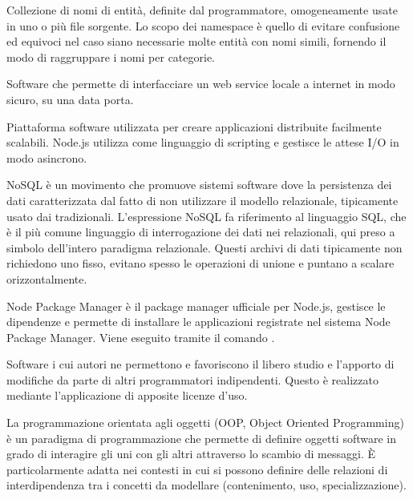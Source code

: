
Collezione di nomi di entità, definite dal programmatore, omogeneamente usate in uno o più file sorgente.  Lo scopo dei namespace è quello di evitare confusione ed equivoci nel caso siano necessarie molte entità con nomi simili, fornendo il modo di raggruppare i nomi per categorie. 

Software che permette di interfacciare un web service locale a internet in modo sicuro, su una data porta.

Piattaforma software utilizzata per creare applicazioni distribuite facilmente scalabili.
Node.js utilizza  come linguaggio di scripting e gestisce le attese I/O in modo asincrono.

NoSQL è un movimento che promuove sistemi software dove la persistenza dei dati caratterizzata dal fatto di non utilizzare il modello relazionale, tipicamente usato dai  tradizionali. L'espressione NoSQL fa riferimento al linguaggio SQL, che è il più comune linguaggio di interrogazione dei dati nei  relazionali, qui preso a simbolo dell'intero paradigma relazionale.
Questi archivi di dati tipicamente non richiedono uno  fisso, evitano spesso le operazioni di unione e puntano a scalare orizzontalmente.

Node Package Manager è il package manager ufficiale per Node.js, gestisce le dipendenze e permette di installare le applicazioni registrate nel sistema Node Package Manager. Viene eseguito tramite il comando .


Software i cui autori ne permettono e favoriscono il libero studio e l'apporto di modifiche da parte di altri programmatori indipendenti. Questo è realizzato mediante l'applicazione di apposite licenze d'uso.

La programmazione orientata agli oggetti (OOP, Object Oriented Programming) è un paradigma di programmazione che permette di definire oggetti software in grado di interagire gli uni con gli altri attraverso lo scambio di messaggi. È particolarmente adatta nei contesti in cui si possono definire delle relazioni di interdipendenza tra i concetti da modellare (contenimento, uso, specializzazione).


